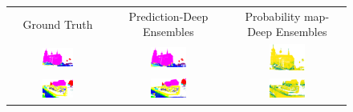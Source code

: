     \begin{figure}[h!]
        \centering
        \begin{tabular}{ccc}
            Ground Truth & Prediction-Deep Ensembles & Probability map-Deep Ensembles \\
            \includegraphics[width=0.33\textwidth, height=0.18\textheight]{images/seg_output/sem3d_seg_output/1_GT.pdf} &
            \includegraphics[width=0.33\textwidth, height=0.18\textheight]{images/seg_output/sem3d_seg_output/1_Pred.pdf}& 
            \includegraphics[width=0.33\textwidth, height=0.18\textheight]{images/seg_output/sem3d_seg_output/1_max_prob.pdf}\\

            \includegraphics[width=0.33\textwidth, height=0.18\textheight]{images/seg_output/sem3d_seg_output/2_GT.pdf} &
            \includegraphics[width=0.33\textwidth, height=0.18\textheight]{images/seg_output/sem3d_seg_output/2_Pred.pdf}& 
            \includegraphics[width=0.33\textwidth, height=0.18\textheight]{images/seg_output/sem3d_seg_output/2_max_prob.pdf}\\


\end{tabular}
\end{figure}

